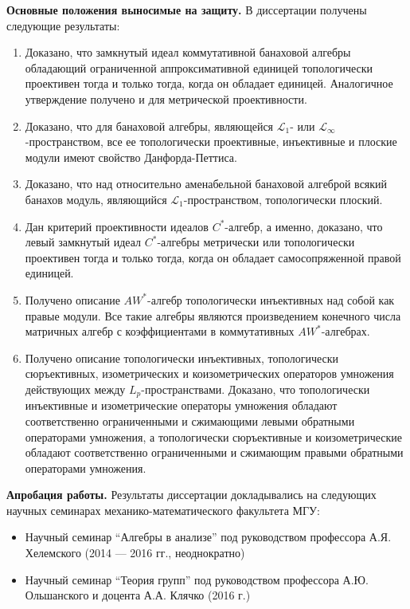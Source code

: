 \textbf{Основные положения выносимые на защиту.} В диссертации получены
следующие результаты:
\begin{enumerate}
    \item Доказано, что замкнутый идеал коммутативной банаховой алгебры
          обладающий ограниченной аппроксимативной единицей топологически
          проективен тогда и только тогда, когда он обладает единицей.
          Аналогичное утверждение получено и для метрической проективности.
    \item Доказано, что для банаховой алгебры, являющейся $\mathscr{L}_1$- или
          $\mathscr{L}_\infty$-пространством, все ее топологически проективные,
          инъективные и плоские модули имеют свойство Данфорда-Петтиса.
    \item Доказано, что над относительно аменабельной банаховой алгеброй всякий
          банахов модуль, являющийся $\mathscr{L}_1$-пространством,
          топологически плоский.
    \item Дан критерий проективности идеалов $C^*$-алгебр, а именно, доказано,
          что левый замкнутый идеал $C^*$-алгебры метрически или топологически
          проективен тогда и только тогда, когда он обладает самосопряженной
          правой единицей.
    \item Получено описание $AW^*$-алгебр топологически инъективных над собой
          как правые модули. Все такие алгебры являются произведением конечного
          числа матричных алгебр с коэффициентами в коммутативных
          $AW^*$-алгебрах.
    \item Получено описание топологически инъективных, топологически
          сюръективных, изометрических и  коизометрических операторов умножения
          действующих между $L_p$-пространствами. Доказано, что топологически
          инъективные и изометрические операторы умножения обладают
          соответственно ограниченными и сжимающими левыми обратными операторами
          умножения, а топологически сюръективные и коизометрические обладают
          соответственно ограниченными и сжимающим правыми обратными операторами
          умножения.
\end{enumerate}

\textbf{Апробация работы.} Результаты диссертации докладывались на следующих
научных семинарах механико-математического факультета МГУ:

\begin{itemize}
    \item Научный семинар ``Алгебры в анализе'' под руководством профессора А.Я.
          Хелемского  (2014 — 2016 гг., неоднократно)
    \item Научный семинар ``Теория групп'' под руководством профессора А.Ю.
          Ольшанского и доцента А.А. Клячко (2016 г.)
\end{itemize}

